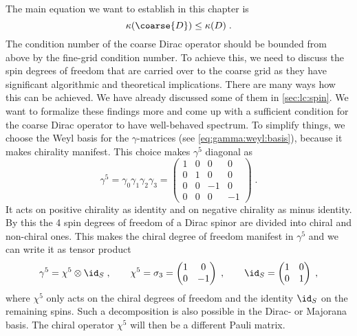 The main equation we want to establish in this chapter is
\begin{equation}
\kappa(\coarse{D}) \leq \kappa(D) \;.
\end{equation}
The condition number of the coarse Dirac operator should be bounded from above by the fine-grid condition number.
To achieve this, we need to discuss the spin degrees of freedom that are carried over to the coarse grid as they have significant algorithmic and theoretical implications.
There are many ways how this can be achieved.
We have already discussed some of them in \cref{sec:lc:spin}.
We want to formalize these findings more and come up with a sufficient condition for the coarse Dirac operator to have well-behaved spectrum.
To simplify things, we choose the Weyl basis for the $\gamma$-matrices (see \cref{eq:gamma:weyl:basis}), because it makes chirality manifest.
This choice makes $\gamma^5$ diagonal as
\begin{equation}
\gamma^5 =
\gamma_0 \gamma_1 \gamma_2 \gamma_3 =
\begin{pmatrix}
1 & 0 & 0 & 0 \\
0 & 1 & 0 & 0 \\
0 & 0 & -1 & 0 \\
0 & 0 & 0 & -1
\end{pmatrix} \;.
\end{equation}
It acts on positive chirality as identity and on negative chirality as minus identity.
By this the \num{4} spin degrees of freedom of a Dirac spinor are divided into chiral and non-chiral ones.
This makes the chiral degree of freedom manifest in $\gamma^5$ and we can write it as tensor product
\begin{equation} \label{eq:strict:separable}
\gamma^5 = \chi^5 \otimes \id_S \;,
\qquad
\chi^5 = 
\sigma_3 = 
\begin{pmatrix}
1 & 0 \\
0 & -1
\end{pmatrix} \;,
\qquad
\id_S = 
\begin{pmatrix}
1 & 0 \\
0 & 1
\end{pmatrix} \;,
\end{equation}
where $\chi^5$ only acts on the chiral degrees of freedom and the identity $\id_S$ on the remaining spins.
Such a decomposition is also possible in the Dirac- or Majorana basis.
The chiral operator $\chi^5$ will then be a different Pauli matrix.


